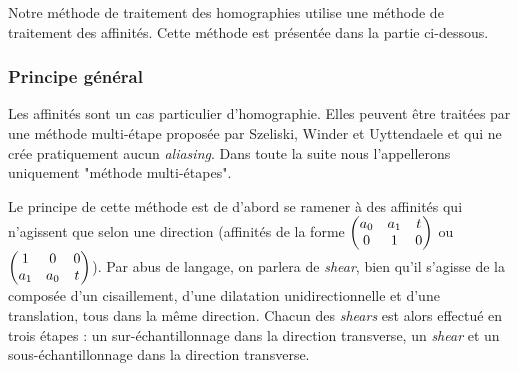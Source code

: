 Notre méthode de traitement des homographies utilise une méthode de traitement des affinités. Cette méthode est présentée dans la partie ci-dessous.
\subsubsection{Principe général}
	
	Les affinités sont un cas particulier d'homographie. Elles peuvent être traitées par une méthode multi-étape proposée par Szeliski, Winder et Uyttendaele \cite{szeliski2010high} et qui ne crée pratiquement aucun \emph{aliasing}. Dans toute la suite nous l'appellerons uniquement "méthode multi-étapes".

	Le principe de cette méthode est de d'abord se ramener à des affinités qui n'agissent que selon une direction (affinités de la forme $\begin{pmatrix} a_0 & a_1 & t\\ 0 & 1 & 0 \end{pmatrix}$ ou $\begin{pmatrix} 1 & 0 & 0\\ a_1 & a_0 & t \end{pmatrix}$). Par abus de langage, on parlera de \emph{shear}, bien qu'il s'agisse de la composée d'un cisaillement, d'une dilatation unidirectionnelle et d'une translation, tous dans la même direction. Chacun des \emph{shears} est alors effectué en trois étapes : un sur-échantillonnage dans la direction transverse, un \emph{shear} et un sous-échantillonnage dans la direction transverse. 
	
